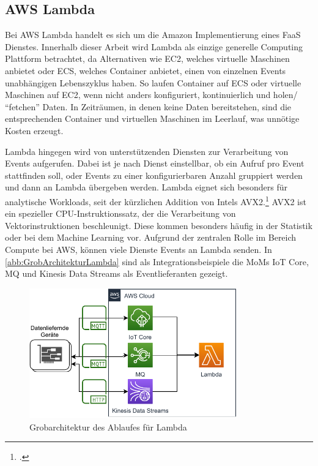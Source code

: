 \subsection{AWS Lambda}\label{chap:vergleich-lambda}


Bei \ac{AWS} Lambda handelt es sich um die Amazon Implementierung eines \ac{FaaS} Dienstes. Innerhalb dieser Arbeit wird Lambda als einzige generelle Computing Plattform betrachtet, da Alternativen wie \ac{EC2}, welches virtuelle Maschinen anbietet oder \ac{ECS}, welches Container anbietet, einen von einzelnen Events unabhängigen Lebenszyklus haben. 
So laufen Container auf \ac{ECS} oder virtuelle Maschinen auf \ac{EC2}, wenn nicht anders konfiguriert, kontinuierlich und holen/ \enquote{fetchen} Daten. In Zeiträumen, in denen keine Daten bereitstehen, sind die entsprechenden Container und virtuellen Maschinen im Leerlauf, was unnötige Kosten erzeugt. 

Lambda hingegen wird von unterstützenden Diensten zur Verarbeitung von Events aufgerufen. 
Dabei ist je nach Dienst einstellbar, ob ein Aufruf pro Event stattfinden soll, oder Events zu einer konfigurierbaren Anzahl gruppiert werden und dann an Lambda übergeben werden. Lambda eignet sich besonders für analytische Workloads, seit der kürzlichen Addition von Intels \ac{AVX2}.\footcite[Vgl. auch im Folgenden][]{Beswick.24.11.2020} \ac{AVX2} ist ein spezieller CPU-Instruktionssatz, der die Verarbeitung von Vektorinstruktionen beschleunigt. Diese kommen besonders häufig in der Statistik oder bei dem Machine Learning vor. 
Aufgrund der zentralen Rolle im Bereich Compute bei \ac{AWS}, können viele Dienste Events an Lambda senden. In \autoref{abb:GrobArchitekturLambda} sind als Integrationsbeispiele die \acp{MoM} \ac{IoT} Core, MQ und Kinesis Data Streams als Eventlieferanten gezeigt.
\begin{figure}[H]
\centering
\includegraphics[width=0.8\textwidth]{graphics/Lambda-general.pdf}
\caption{Grobarchitektur des Ablaufes für Lambda}
\label{abb:GrobArchitekturLambda}
\end{figure}

